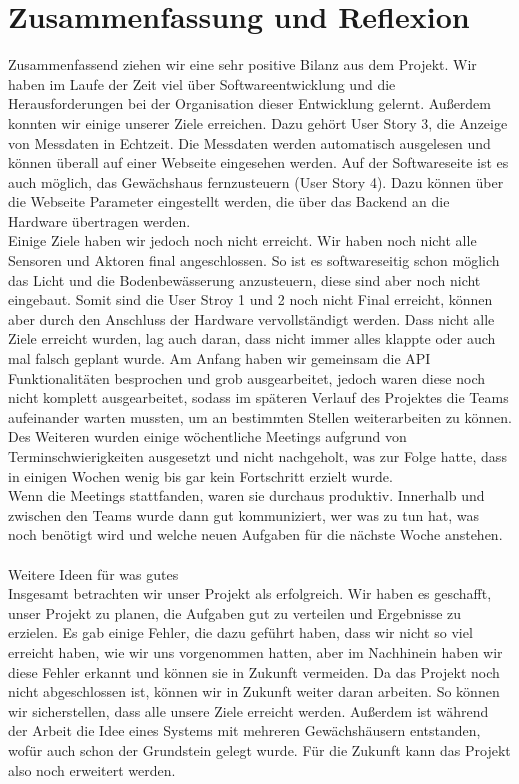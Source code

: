 \section{Zusammenfassung und Reflexion}
Zusammenfassend ziehen wir eine sehr positive Bilanz aus dem Projekt. Wir haben im Laufe der Zeit viel über Softwareentwicklung und die Herausforderungen bei der Organisation dieser Entwicklung gelernt. Außerdem konnten wir einige unserer Ziele erreichen. Dazu gehört User Story 3, die Anzeige von Messdaten in Echtzeit. Die Messdaten werden automatisch ausgelesen und können überall auf einer Webseite eingesehen werden. Auf der Softwareseite ist es auch möglich, das Gewächshaus fernzusteuern (User Story 4). Dazu können über die Webseite Parameter eingestellt werden, die über das Backend an die Hardware übertragen werden. \\
Einige Ziele haben wir jedoch noch nicht erreicht. Wir haben noch nicht alle Sensoren und Aktoren final angeschlossen. So ist es softwareseitig schon möglich das Licht und die Bodenbewässerung anzusteuern, diese sind aber noch nicht eingebaut. Somit sind die User Stroy 1 und 2 noch nicht Final erreicht, können aber durch den Anschluss der Hardware vervollständigt werden. Dass nicht alle Ziele erreicht wurden, lag auch daran, dass nicht immer alles klappte oder auch mal falsch geplant wurde. Am Anfang haben wir gemeinsam die API Funktionalitäten besprochen und grob ausgearbeitet, jedoch waren diese noch nicht komplett ausgearbeitet, sodass im späteren Verlauf des Projektes die Teams aufeinander warten mussten, um an bestimmten Stellen weiterarbeiten zu können. Des Weiteren wurden einige wöchentliche Meetings aufgrund von Terminschwierigkeiten ausgesetzt und nicht nachgeholt, was zur Folge hatte, dass in einigen Wochen wenig bis gar kein Fortschritt erzielt wurde.\\
Wenn die Meetings stattfanden, waren sie durchaus produktiv. Innerhalb und zwischen den Teams wurde dann gut kommuniziert, wer was zu tun hat, was noch benötigt wird und welche neuen Aufgaben für die nächste Woche anstehen.\\
\\
Weitere Ideen für was gutes
\\


Insgesamt betrachten wir unser Projekt als erfolgreich. Wir haben es geschafft, unser Projekt zu planen, die Aufgaben gut zu verteilen und Ergebnisse zu erzielen. Es gab einige Fehler, die dazu geführt haben, dass wir nicht so viel erreicht haben, wie wir uns vorgenommen hatten, aber im Nachhinein haben wir diese Fehler erkannt und können sie in Zukunft vermeiden. Da das Projekt noch nicht abgeschlossen ist, können wir in Zukunft weiter daran arbeiten. So können wir sicherstellen, dass alle unsere Ziele erreicht werden. Außerdem ist während der Arbeit die Idee eines Systems mit mehreren Gewächshäusern entstanden, wofür auch schon der Grundstein gelegt wurde. Für die Zukunft kann das Projekt also noch erweitert werden.





\pagebreak
